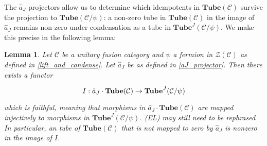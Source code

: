 \documentclass[12pt,a4paper]{article}
\newtheorem{lemma}[theorem]{Lemma}
\newcounter{arrow}
\newcommand{\mcz}{\mathcal{Z}}
\newcommand{\mcc}{\mathcal{C}}
\newcommand{\tube}{\textbf{Tube}}
\newcommand{\ethan}[1]{{\color{amethyst}\footnotesize{(EL) #1}}}
\begin{document}
The $\hat{a}_J$ projectors allow us to determine which idempotents in $\tube(\mcc)$ survive the projection 
to $\tube(\mcc/\psi)$:
a non-zero tube in $\tube(\mcc)$ in the image of $\hat{a}_J$ remains non-zero under condensation as a tube in $\tube^J(\mcc/\psi)$. 
We make this precise in the following lemma:

\begin{lemma}
\label{image_aJ}
Let $\mcc$ be a unitary fusion category and $\psi$ a fermion in $\mcz(\mcc)$ as defined in \ref{lift_and_condense}.
Let $\hat{a}_J$ be as defined in \eqref{aJ_projector}.
Then there exists a functor 
\[\begin{tikzcd}        
   I: \hat{a}_J \cdot \tube(\mcc) \rightarrow \tube^J(\mcc/\psi)
\end{tikzcd}\]
which is faithful, meaning that morphisms in $\hat{a}_J\cdot\tube(\mcc)$ are mapped injectively to morphisms in $\tube^J(\mcc/\psi)$. 
\ethan{may still need to be rephrased}
In particular, an tube of $\tube(\mcc)$ that is not mapped to zero by $\hat{a}_J$ is nonzero in the image of $I$. 
\end{lemma}
\end{document}
